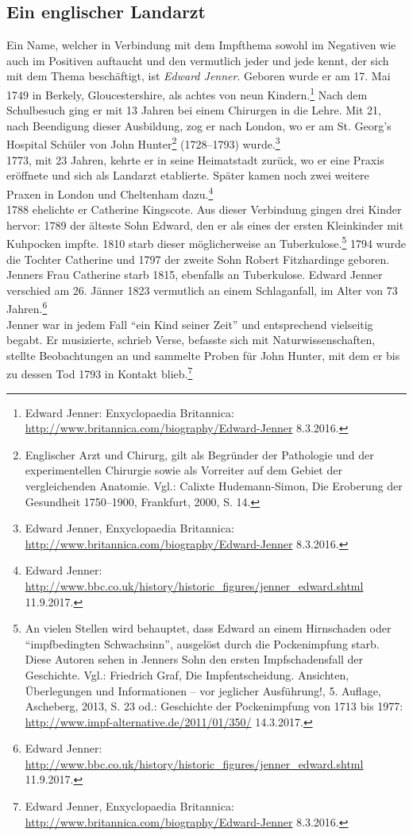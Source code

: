 \documentclass[
    a4paper,
    12pt,
    hyphens,
    chapterprefix=true,
    headheight=33pt,
    footheight=29pt,
    headings=optiontohead,
]{scrartcl}
\begin{document}
\subsection{Ein englischer Landarzt}
Ein Name, welcher in Verbindung mit dem Impfthema sowohl im Negativen wie auch im Positiven auftaucht und den vermutlich jeder und jede kennt, der sich mit dem Thema beschäftigt, ist \textit{Edward Jenner}.
Geboren wurde er am 17. Mai 1749 in Berkely, Gloucestershire, als achtes von neun Kindern.\footnote{Edward Jenner:  Enxyclopaedia Britannica: \url{http://www.britannica.com/biography/Edward-Jenner} 8.3.2016.} Nach dem Schulbesuch ging er mit 13 Jahren bei einem Chirurgen in die Lehre. Mit 21, nach Beendigung dieser Ausbildung, zog er nach London, wo er am St. Georg's Hospital Schüler von John Hunter\footnote{Englischer Arzt und Chirurg, gilt als Begründer der Pathologie und der experimentellen Chirurgie sowie als Vorreiter auf dem Gebiet der vergleichenden Anatomie. Vgl.: Calixte Hudemann-Simon, Die Eroberung der Gesundheit 1750--1900, Frankfurt, 2000, S. 14.} (1728--1793) wurde.\footnote{Edward Jenner, Enxyclopaedia Britannica: \url{http://www.britannica.com/biography/Edward-Jenner} 8.3.2016.}\\
1773, mit 23 Jahren, kehrte er in seine Heimatstadt zurück, wo er eine Praxis eröffnete und sich als Landarzt etablierte. Später kamen noch zwei weitere Praxen in London und Cheltenham dazu.\footnote{Edward Jenner: \url{http://www.bbc.co.uk/history/historic_figures/jenner_edward.shtml} 11.9.2017.}\\
1788 ehelichte er Catherine Kingscote. Aus dieser Verbindung gingen drei Kinder hervor: 1789 der älteste Sohn Edward, den er als eines der ersten Kleinkinder mit Kuhpocken impfte. 1810 starb dieser möglicherweise an Tuberkulose.\footnote{An vielen Stellen wird behauptet, dass Edward an einem Hirnschaden oder "`impfbedingten Schwachsinn"', ausgelöst durch die Pockenimpfung starb. Diese Autoren sehen in Jenners Sohn den ersten Impfschadensfall der Geschichte. Vgl.: Friedrich Graf, Die Impfentscheidung. Ansichten, Überlegungen und Informationen -- vor jeglicher Ausführung!, 5. Auflage, Ascheberg, 2013, S. 23 od.: Geschichte der Pockenimpfung von 1713 bis 1977: \url{http://www.impf-alternative.de/2011/01/350/} 14.3.2017.} 1794 wurde die Tochter Catherine und 1797 der zweite Sohn Robert Fitzhardinge geboren. Jenners Frau Catherine starb 1815, ebenfalls an Tuberkulose. Edward Jenner verschied am 26. Jänner 1823 vermutlich an einem Schlaganfall, im Alter von 73 Jahren.\footnote{Edward Jenner: \url{http://www.bbc.co.uk/history/historic\_figures/jenner\_edward.shtml} 11.9.2017.}\\
Jenner war in jedem Fall "`ein Kind seiner Zeit"' und entsprechend vielseitig begabt. Er musizierte, schrieb Verse, befasste sich mit Naturwissenschaften, stellte Beobachtungen an und sammelte Proben für John Hunter, mit dem er bis zu dessen Tod 1793 in Kontakt blieb.\footnote{Edward Jenner, Enxyclopaedia Britannica: \url{http://www.britannica.com/biography/Edward-Jenner} 8.3.2016.}\\
\end{document}
